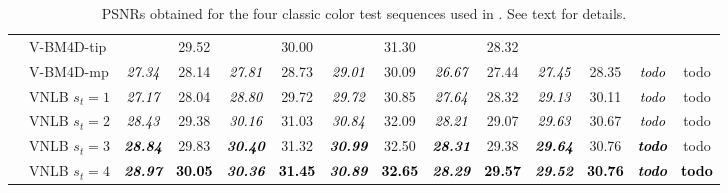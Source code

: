 \documentclass[10pt, journal, twocolumn, final, a4paper]{IEEEtran}
\newcommand{\best}[1]{#1}
\newcommand{\bsic}[1]{\textcolor{black}{\textit{#1}}}
\newcommand{\Bsic}[1]{\textcolor{black}{\textbf{\textit{#1}}}}
\newcommand{\Best}[1]{\textbf{\textcolor{black}{#1}}}
\begin{document}
\begin{table}[htp!]
\begin{center}
{\begin{tabular}{ c | l |c c | c c | c c | c c | c c | c c}
			                      & V-BM4D-tip           & \bsic{     } & \best{29.52} & \bsic{     } & \best{30.00} & \bsic{     } & \best{31.30} & \bsic{     } &       28.32  & \bsic{     } &              & \bsic{     } &              \\
			                      & V-BM4D-mp            & \bsic{27.34} &       28.14  & \bsic{27.81} &       28.73  & \bsic{29.01} &       30.09  & \bsic{26.67} &       27.44  & \bsic{27.45} &       28.35  & \bsic{todo } &       todo   \\
			                      & VNLB   $s_t = 1$     & \bsic{27.17} &       28.04  & \bsic{28.80} &       29.72  & \bsic{29.72} &       30.85  & \bsic{27.64} &       28.32  & \bsic{29.13} &       30.11  & \bsic{todo } &       todo   \\
			                      & VNLB   $s_t = 2$     & \bsic{28.43} &       29.38  & \bsic{30.16} &       31.03  & \bsic{30.84} &       32.09  & \bsic{28.21} &       29.07  & \bsic{29.63} &       30.67  & \bsic{todo } &       todo   \\
			                      & VNLB   $s_t = 3$     & \Bsic{28.84} &       29.83  & \Bsic{30.40} &       31.32  & \Bsic{30.99} &       32.50  & \Bsic{28.31} &       29.38  & \Bsic{29.64} &       30.76  & \Bsic{todo } &       todo   \\
			                      & VNLB   $s_t = 4$     & \Bsic{28.97} & \Best{30.05} & \Bsic{30.36} & \Best{31.45} & \Bsic{30.89} & \Best{32.65} & \Bsic{28.29} & \Best{29.57} & \Bsic{29.52} & \Best{30.76} & \Bsic{todo } & \Best{todo } \\\hline
		\end{tabular}}
	\end{center}
	\caption{PSNRs obtained for the four classic color test sequences used in
	\cite{Maggioni2012}. See text for details.}
	\label{tab:psnr-classic-color}
\end{table}
\end{document}
